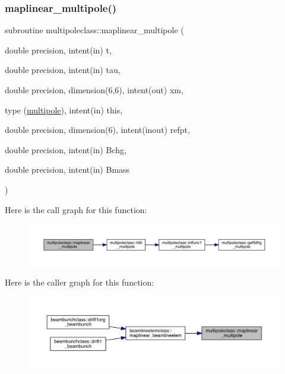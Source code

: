 \subsubsection{\texorpdfstring{maplinear\_multipole()}{maplinear\_multipole()}}
{\footnotesize\ttfamily subroutine multipoleclass\+::maplinear\+\_\+multipole (\begin{DoxyParamCaption}\item[{double precision, intent(in)}]{t,  }\item[{double precision, intent(in)}]{tau,  }\item[{double precision, dimension(6,6), intent(out)}]{xm,  }\item[{type (\mbox{\hyperlink{namespacemultipoleclass_structmultipoleclass_1_1multipole}{multipole}}), intent(in)}]{this,  }\item[{double precision, dimension(6), intent(inout)}]{refpt,  }\item[{double precision, intent(in)}]{Bchg,  }\item[{double precision, intent(in)}]{Bmass }\end{DoxyParamCaption})}

Here is the call graph for this function\+:\nopagebreak
\begin{figure}[H]
\begin{center}
\leavevmode
\includegraphics[width=350pt]{namespacemultipoleclass_ab9ed6db5fa3b4ea0f6e1a07cd6d57431_cgraph}
\end{center}
\end{figure}
Here is the caller graph for this function\+:\nopagebreak
\begin{figure}[H]
\begin{center}
\leavevmode
\includegraphics[width=350pt]{namespacemultipoleclass_ab9ed6db5fa3b4ea0f6e1a07cd6d57431_icgraph}
\end{center}
\end{figure}
\mbox{\label{namespacemultipoleclass_aebbed53759ae97dc55df35264c89274c}} 
